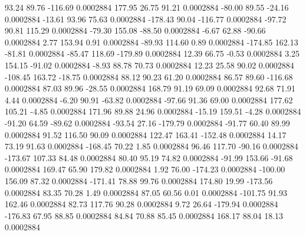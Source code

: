        93.24       89.76     -116.69     0.0002884
      177.95       26.75       91.21     0.0002884
      -80.00       89.55      -24.16     0.0002884
      -13.61       93.96       75.63     0.0002884
     -178.43       90.04     -116.77     0.0002884
      -97.72       90.81      115.29     0.0002884
      -79.30      155.08      -88.50     0.0002884
       -6.67       62.88      -90.66     0.0002884
        2.77      153.94        0.91     0.0002884
      -89.93      114.60        0.89     0.0002884
     -174.85      162.13      -81.81     0.0002884
      -85.47      118.69     -179.89     0.0002884
       12.39       66.75       -0.53     0.0002884
        3.25      154.15      -91.02     0.0002884
       -8.93       88.78       70.73     0.0002884
       12.23       25.58       90.02     0.0002884
     -108.45      163.72      -18.75     0.0002884
       88.12       90.23       61.20     0.0002884
       86.57       89.60     -116.68     0.0002884
       87.03       89.96      -28.55     0.0002884
      168.79       91.19       69.09     0.0002884
       92.68       71.91        4.44     0.0002884
       -6.20       90.91      -63.82     0.0002884
      -97.66       91.36       69.00     0.0002884
      177.62      105.21       -4.85     0.0002884
      171.96       89.88       24.96     0.0002884
      -15.19      159.51       -4.28     0.0002884
      -91.20       64.59      -89.62     0.0002884
      -93.54       27.16     -179.79     0.0002884
      -91.77       60.40       89.99     0.0002884
       91.52      116.50       90.09     0.0002884
      122.47      163.41     -152.48     0.0002884
       14.17       73.19       91.63     0.0002884
     -168.45       70.22        1.85     0.0002884
       96.46      117.70      -90.16     0.0002884
     -173.67      107.33       84.48     0.0002884
       80.40       95.19       74.82     0.0002884
      -91.99      153.66      -91.68     0.0002884
      169.47       65.90      179.82     0.0002884
        1.92       76.00     -174.23     0.0002884
     -100.00      156.09       87.32     0.0002884
     -171.41       78.88       99.76     0.0002884
      174.80       19.99     -173.56     0.0002884
       83.35       70.28        1.49     0.0002884
       87.05       60.56        0.01     0.0002884
     -101.75       91.93      162.46     0.0002884
       82.73      117.76       90.28     0.0002884
        9.72       26.64     -179.94     0.0002884
     -176.83       67.95       88.85     0.0002884
       84.84       70.88       85.45     0.0002884
      168.17       88.04       18.13     0.0002884
